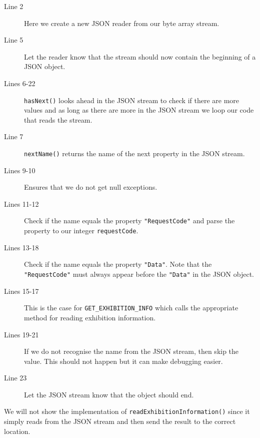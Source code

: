 \begin{description}
\item[Line 2] Here we create a new JSON reader from our byte array stream.
\item[Line 5] Let the reader know that the stream should now contain the beginning of a JSON object.
\item[Lines 6-22] \lstinline|hasNext()| looks ahead in the JSON stream to check if there are more values and as long as there are more in the JSON stream we loop our code that reads the stream.
\item[Line 7] \lstinline|nextName()| returns the name of the next property in the JSON stream.
\item[Lines 9-10] Ensures that we do not get null exceptions.
\item[Lines 11-12] Check if the name equals the property \lstinline|"RequestCode"| and parse the property to our integer \lstinline|requestCode|.
\item[Lines 13-18] Check if the name equals the property \lstinline|"Data"|. Note that the \lstinline|"RequestCode"| must always appear before the \lstinline|"Data"| in the JSON object.
\item[Lines 15-17] This is the case for \lstinline|GET_EXHIBITION_INFO| which calls the appropriate method for reading exhibition information.
\item[Lines 19-21] If we do not recognise the name from the JSON stream, then skip the value. This should not happen but it can make debugging easier.
\item[Line 23] Let the JSON stream know that the object should end.
\end{description}
We will not show the implementation of \lstinline|readExhibitionInformation()| since it simply reads from the JSON stream and then send the result to the correct location.
